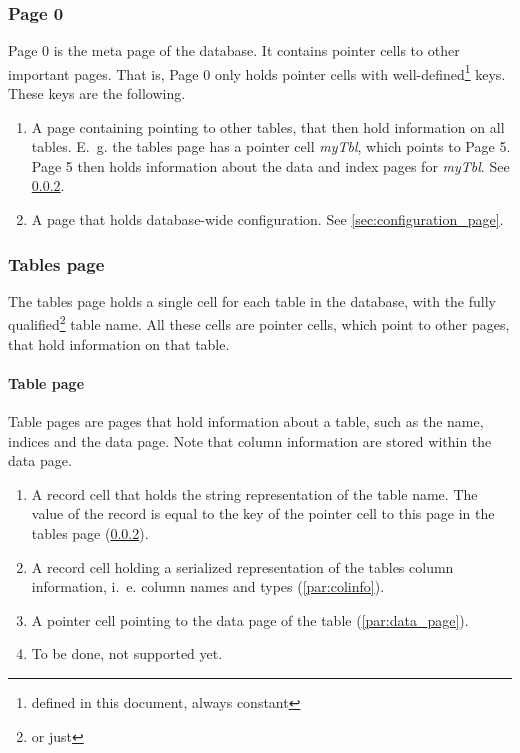 \subsubsection{Page 0}
\label{sec:page_0}
Page 0 is the meta page of the database.
It contains pointer cells to other important pages.
That is, Page 0 only holds pointer cells with well-defined\footnote{defined in this document, always constant} keys.
These keys are the following.

\begin{enumerate}
    \item[\go{tables}] A page containing pointing to other tables, that then hold information on all tables. E.~g. the tables page has a pointer cell \emph{myTbl}, which points to Page 5. Page 5 then holds information about the data and index pages for \emph{myTbl}. See \ref{sec:tables_page}.
    \item[\go{config}] A page that holds database-wide configuration. See \ref{sec:configuration_page}.
\end{enumerate}

\subsubsection{Tables page}
\label{sec:tables_page}
The tables page holds a single cell for each table in the database, with the fully qualified\footnote{ or just } table name.
All these cells are pointer cells, which point to other pages, that hold information on that table.

\paragraph{Table page}
\label{par:table_page}
Table pages are pages that hold information about a table, such as the name, indices and the data page.
Note that column information are stored within the data page.

\begin{enumerate}
    \item[\go{name}] A record cell that holds the string representation of the table name. The value of the record is equal to the key of the pointer cell to this page in the tables page (\ref{sec:tables_page}).
    \item[\go{colinfo}] A record cell holding a serialized representation of the tables column information, i.~e. column names and types (\ref{par:colinfo}).
    \item[\go{data}] A pointer cell pointing to the data page of the table (\ref{par:data_page}).
    \item[\go{index.<indexName>}] To be done, not supported yet.
\end{enumerate}

